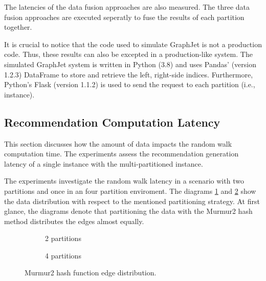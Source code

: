 The latencies of the data fusion approaches are also measured. The three data fusion approaches are executed seperatly to fuse the results of each partition together.


It is crucial to notice that the code used to simulate GraphJet is not a production code. Thus, these results can also be excepted in a production-like system. The simulated GraphJet system is written in Python (3.8) and uses Pandas' (version 1.2.3) DataFrame to store and retrieve the left, right-side indices. Furthermore, Python's Flask (version 1.1.2) is used to send the request to each partition (i.e., instance).


\subsection{Recommendation Computation Latency}
\label{subsec:recommendation-computation-latency}
This section discusses how the amount of data impacts the random walk computation time. The experiments assess the recommendation generation latency of a single instance with the multi-partitioned instance.


The experiments investigate the random walk latency in a scenario with two partitions and once in an four partition enviroment. The diagrams \ref{plot:edge-distribution-2-partitions-murmur2} and \ref{plot:edge-distribution-4-partitions-murmur2} show the data distribution with respect to the mentioned partitioning strategy. At first glance, the diagrams denote that partitioning the data with the Murmur2 hash method distributes the edges almost equally. 

\begin{figure}[!htb]
    \centering
    \begin{subfigure}{\textwidth}
        \centering
        
        \caption{2 partitions}
        \label{plot:edge-distribution-2-partitions-murmur2}
    \end{subfigure}\qquad

    \begin{subfigure}{\textwidth}
        \centering
        
        \caption{4 partitions}
        \label{plot:edge-distribution-4-partitions-murmur2}
    \end{subfigure}\qquad
    \caption{Murmur2 hash function edge distribution.}
    \label{plot:edge-distirbution-murmur2}
\end{figure}


